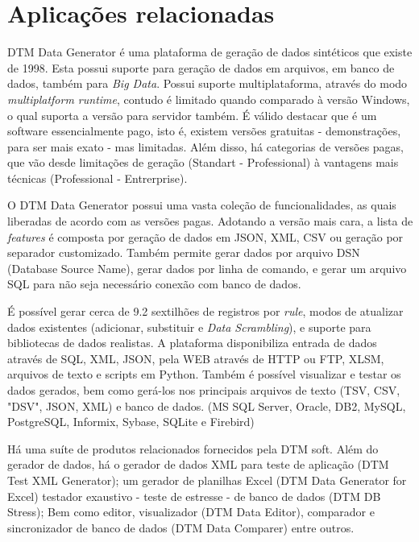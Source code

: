 \documentclass[
	12pt,				%
	openright,			%
	twoside,			%
	a4paper,			%
	english,			%
	brazil				%
	]{abntex2}
\begin{document}
	\section{Aplicações relacionadas}

		DTM Data Generator \cite{DTMDataGenerator} é uma plataforma de geração de dados sintéticos que existe de 1998.
		Esta possui suporte para geração de dados em arquivos, em banco de dados, também para \emph{Big Data}.
		Possui suporte multiplataforma, através do modo \emph{multiplatform runtime}, contudo é limitado quando comparado à versão Windows, o qual suporta a versão para servidor também.
		É válido destacar que é um software essencialmente pago, isto é, existem versões gratuitas - demonstrações, para ser mais exato - mas limitadas.
		Além disso, há categorias de versões pagas, que vão desde limitações de geração (Standart - Professional) à vantagens mais técnicas (Professional - Entrerprise).
		\par
		O DTM Data Generator possui uma vasta coleção de funcionalidades, as quais liberadas de acordo com as versões pagas.
		Adotando a versão mais cara, a lista de \emph{features} é composta por geração de dados em JSON, XML, CSV ou geração por separador customizado.
		Também permite gerar dados por arquivo DSN (Database Source Name), gerar dados por linha de comando, e gerar um arquivo SQL para não seja necessário conexão com banco de dados.
		\par
		É possível gerar cerca de 9.2 sextilhões de registros por \emph{rule}, modos de atualizar dados existentes (adicionar, substituir e \emph{Data Scrambling}), e suporte para bibliotecas de dados realistas.
		A plataforma disponibiliza entrada de dados através de SQL, XML, JSON, pela WEB através de HTTP ou FTP, XLSM, arquivos de texto e scripts em Python.
		Também é possível visualizar e testar os dados gerados, bem como gerá-los nos principais arquivos de texto (TSV, CSV, "DSV", JSON, XML) e banco de dados. (MS SQL Server, Oracle, DB2, MySQL, PostgreSQL, Informix, Sybase, SQLite e Firebird) 
		\par
		Há uma suíte de produtos relacionados fornecidos pela DTM soft. 
		Além do gerador de dados, 
			há o gerador de dados XML para teste de aplicação (DTM Test XML Generator);
			um gerador de planilhas Excel (DTM Data Generator for Excel)
			testador exaustivo - teste de estresse - de banco de dados (DTM DB Stress);
			Bem como editor, visualizador (DTM Data Editor), comparador e sincronizador de banco de dados (DTM Data Comparer) entre outros. 
\end{document}

